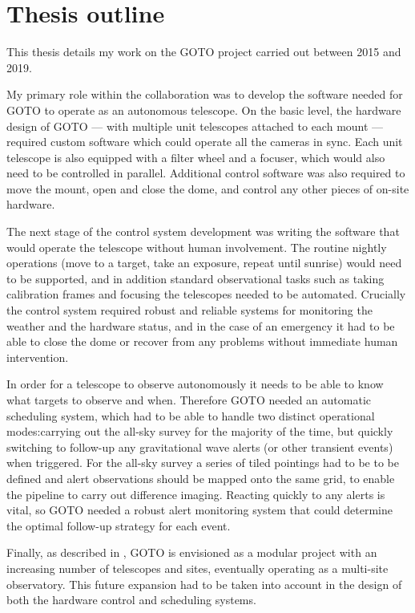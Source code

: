 \section{Thesis outline}
\label{sec:outline}
\begin{colsection}

This thesis details my work on the GOTO project carried out between 2015 and 2019.

My primary role within the collaboration was to develop the software needed for GOTO to operate as an autonomous telescope. On the basic level, the hardware design of GOTO --- with multiple unit telescopes attached to each mount --- required custom software which could operate all the cameras in sync. Each unit telescope is also equipped with a filter wheel and a focuser, which would also need to be controlled in parallel. Additional control software was also required to move the mount, open and close the dome, and control any other pieces of on-site hardware.

The next stage of the control system development was writing the software that would operate the telescope without human involvement. The routine nightly operations (move to a target, take an exposure, repeat until sunrise) would need to be supported, and in addition standard observational tasks such as taking calibration frames and focusing the telescopes needed to be automated. Crucially the control system required robust and reliable systems for monitoring the weather and the hardware status, and in the case of an emergency it had to be able to close the dome or recover from any problems without immediate human intervention.

In order for a telescope to observe autonomously it needs to be able to know what targets to observe and when. Therefore GOTO needed an automatic scheduling system, which had to be able to handle two distinct operational modes:\@ carrying out the all-sky survey for the majority of the time, but quickly switching to follow-up any gravitational wave alerts (or other transient events) when triggered. For the all-sky survey a series of tiled pointings had to be to be defined and alert observations should be mapped onto the same grid, to enable the pipeline to carry out difference imaging. Reacting quickly to any alerts is vital, so GOTO needed a robust alert monitoring system that could determine the optimal follow-up strategy for each event.

Finally, as described in , GOTO is envisioned as a modular project with an increasing number of telescopes and sites, eventually operating as a multi-site observatory. This future expansion had to be taken into account in the design of both the hardware control and scheduling systems.


\end{colsection}
